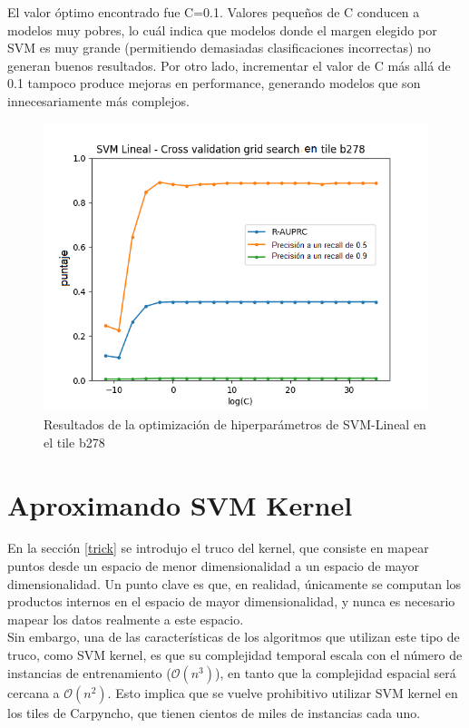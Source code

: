 El valor óptimo encontrado fue C=0.1. Valores pequeños de C conducen a modelos muy pobres, lo cuál indica que modelos donde el margen elegido por SVM es muy grande (permitiendo demasiadas clasificaciones incorrectas) no generan buenos resultados. Por otro lado, incrementar el valor de C más allá de 0.1 tampoco produce mejoras en performance, generando modelos que son innecesariamente más complejos.


\begin{figure}[h!]
\begin{center}
  \includegraphics[width=.6\textwidth]{Kap3/Figure_1.png}
  \end{center}
  \caption{Resultados de la optimización de hiperparámetros de SVM-Lineal en el tile b278}
  \label{fig:optimisationsvml}
\end{figure}


\section{Aproximando SVM Kernel}
En la sección \ref{trick} se introdujo el truco del kernel, que consiste en mapear puntos desde un espacio de menor dimensionalidad a un espacio de mayor dimensionalidad. Un punto clave es que, en realidad, únicamente se computan los productos internos en el espacio de mayor dimensionalidad, y nunca es necesario mapear los datos realmente a este espacio. \\

Sin embargo, una de las características de los algoritmos que utilizan este tipo de truco, como SVM kernel, es que su complejidad temporal escala con el número de instancias de entrenamiento ($\mathcal{O}(n^3)$), en tanto que la complejidad espacial será cercana a $\mathcal{O}(n^2)$. Esto implica que se vuelve prohibitivo utilizar SVM kernel en los tiles de Carpyncho, que tienen cientos de miles de instancias cada uno. \\

